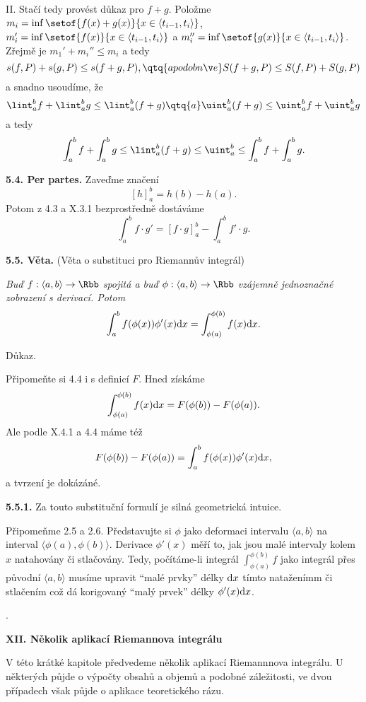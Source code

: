 \documentclass[12pt]{article}
\begin{document}
{\smallskip

II. Stačí tedy provést důkaz pro $f+g$. Položme 
$m_i=\inf\setof{f(x)+g(x)}{x\in\langle t_{i-1},t_i\rangle}$, 
$m'_i=\inf\setof{f(x)}{x\in\langle t_{i-1},t_i\rangle}$ a $m''_i=\inf\setof{g(x)}{x\in\langle t_{i-1},t_i\rangle}$. Zřejmě je $m_1'+m_i''\leq m_i$ a tedy
$$
s(f,P)+s(g,P)\leq s(f+g,P), \qtq{a podobně} S(f+g,P)\leq S(f,P)+S(g,P)
$$
a snadno usoudíme, že
$$
\lint_a^b f+\lint_a^b g\leq \lint_a^b (f+g) \qtq{a} \uint_a^b (f+g)\leq\uint_a^b f+\uint_a^b g
$$
a tedy
$$
\int_a^b f+\int_a^b g\leq  \lint_a^b (f+g) \leq \uint_a^b\leq \int_a^b f+\int_a^b g.
$$\sq

\bigskip

{\bf 5.4. Per partes.} Zaveďme značení
$$
[h]_a^b =h(b)-h(a).
$$
Potom z 4.3 a X.3.1 bezprostředně dostáváme
$$
\int_a^b f\cdot g'=[f\cdot g]_a^b-\int_a^b f'\cdot g.
$$

\bigskip

{\bf 5.5. Věta.} (Věta o substituci pro Riemannův integrál) {\em Buď $f:\langle a,b\rangle \to\Rbb$ spojitá a buď $\phi:\langle a,b\rangle \to\Rbb$ vzájemně jednoznačné zobrazení s derivací. Potom
$$
\int_a^bf(\phi(x))\phi'(x)\d x=\int_{\phi(a)}^{\phi(b)}f(x)\d x.
$$

Důkaz.} Připomeňte si 4.4 i s definicí $F$. Hned získáme
$$
\int_{\phi(a)}^{\phi(b)}f(x)\d x=F(\phi(b))-F(\phi(a)).
$$
Ale podle  X.4.1 a 4.4 máme též
$$
F(\phi(b))-F(\phi(a))=\int_a^bf(\phi(x))\phi'(x)\d x,
$$
a tvrzení je dokázáné.\sq

\medskip

{\bf 5.5.1.} Za touto substituční formulí je silná geometrická intuice.

 Připomeňme 2.5 a 2.6.
 Představujte si $\phi$ jako deformaci intervalu $\langle a,b \rangle$ na interval
 $\langle \phi(a),\phi(b)\rangle$. Derivace $\phi'(x)$ měří to, jak jsou malé intervaly kolem $x$
 natahovány či stlačovány. Tedy, počítáme-li integrál $\int_{\phi(a)}^{\phi(b)} f$  jako integrál přes původní $\langle a,b\rangle$ musíme upravit ``malé prvky'' délky $\d x$
tímto nataženímm či stlačením což dá korigovaný ``malý prvek'' délky $\phi'(x)\d x$.

\newpage
{.}
\newpage
 
\centerline{\Large\bf XII. Několik aplikací Riemannova integrálu} 
 
 
 \vskip10mm
 
 
 \def\d{\text{d}}
 
 V této krátké kapitole předvedeme několik aplikací Riemannnova integrálu. U některých půjde o výpočty obsahů a objemů a podobné záležitosti, ve dvou případech však půjde o aplikace teoretického rázu.
 
}
\end{document}
